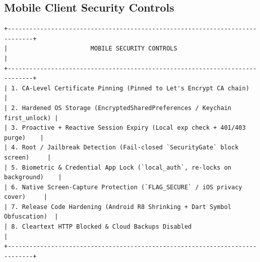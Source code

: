 \documentclass[11pt,a4paper]{article}
\begin{document}
\subsection{Mobile Client Security Controls}
\begin{lstlisting}[style=asciiart]
+-----------------------------------------------------------------------------+
|                       MOBILE SECURITY CONTROLS                              |
+-----------------------------------------------------------------------------+
| 1. CA-Level Certificate Pinning (Pinned to Let's Encrypt CA chain)          |
| 2. Hardened OS Storage (EncryptedSharedPreferences / Keychain first_unlock) |
| 3. Proactive + Reactive Session Expiry (Local exp check + 401/403 purge)    |
| 4. Root / Jailbreak Detection (Fail-closed `SecurityGate` block screen)     |
| 5. Biometric & Credential App Lock (`local_auth`, re-locks on background)    |
| 6. Native Screen-Capture Protection (`FLAG_SECURE` / iOS privacy cover)     |
| 7. Release Code Hardening (Android R8 Shrinking + Dart Symbol Obfuscation)  |
| 8. Cleartext HTTP Blocked & Cloud Backups Disabled                          |
+-----------------------------------------------------------------------------+
\end{lstlisting}
\end{document}
